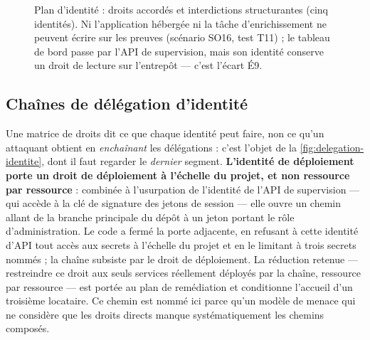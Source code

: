 \begin{figure}[htbp]
\caption[Plan d'identité : droits accordés et interdictions structurantes]{Plan d'identité : droits
accordés et interdictions structurantes (cinq identités). Ni l'application hébergée ni la tâche
d'enrichissement ne peuvent écrire sur les preuves (scénario SO16, test T11) ; le tableau de bord
passe par l'API de supervision, mais son identité conserve un droit de lecture sur l'entrepôt ---
c'est l'écart É9.}%
\label{fig:plan-identite}
\end{figure}

\subsection{Chaînes de délégation d'identité}
\label{subsec:delegation}

Une matrice de droits dit ce que chaque identité peut faire, non ce qu'un attaquant obtient en
\emph{enchaînant} les délégations : c'est l'objet de la \cref{fig:delegation-identite}, dont il faut
regarder le \emph{dernier} segment. \textbf{L'identité de déploiement porte un droit de déploiement
à l'échelle du projet, et non ressource par ressource} : combinée à l'usurpation de l'identité de
l'API de supervision --- qui accède à la clé de signature des jetons de session --- elle ouvre un
chemin allant de la branche principale du dépôt à un jeton portant le rôle d'administration. Le code
a fermé la porte adjacente, en refusant à cette identité d'API tout accès aux secrets à l'échelle du
projet et en le limitant à trois secrets nommés ; la chaîne subsiste par le droit de déploiement. La
réduction retenue --- restreindre ce droit aux seuls services réellement déployés par la chaîne,
ressource par ressource --- est portée au plan de remédiation et conditionne l'accueil d'un
troisième locataire. Ce chemin est nommé ici parce qu'un modèle de menace qui ne considère que les
droits directs manque systématiquement les chemins composés.

